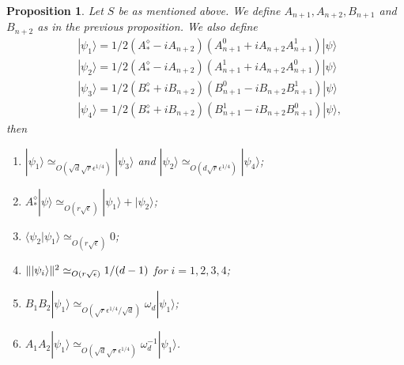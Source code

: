 \documentclass[11pt,letterpaper]{article}
\newcommand{\ket}[1]{|#1\rangle}
\newcommand{\braket}[2]{\langle#1|#2\rangle}
\DeclarePairedDelimiter{\norm}{\lVert}{\rVert}
\newcommand{\1}{\mathbb{1}}
\newcommand{\se}{\sqrt{\epsilon}}
\newcommand{\qe}{\epsilon^{1/4}}
\newcommand{\sd}{\sqrt{d}}
\newcommand{\sr}{\sqrt{r}}
\newcommand{\appd}[1]{\simeq_{#1}}
\newtheorem{proposition}[theorem]{Proposition}
\theoremstyle{definition}
\begin{document}
\begin{proposition}
	Let $S$ be as mentioned above. We define $A_{n+1}, A_{n+2},B_{n+1}$ and $B_{n+2}$ as in the previous proposition.
	We also define
	\begin{align}
		&\ket{\psi_1} =1/2 (A_\ast^\diamond - iA_{n+2})(A_{n+1}^0 + iA_{n+2}A_{n+1}^1) \ket{\psi} \\
		&\ket{\psi_2} = 1/2 (A_\ast^\diamond - iA_{n+2})(A_{n+1}^1 + iA_{n+2}A_{n+1}^0) \ket{\psi} \\
		&\ket{\psi_3} =1/2 (B_\ast^\diamond + i B_{n+2})(B_{n+1}^0 - iB_{n+2}B_{n+1}^1) \ket{\psi}  \\
		&\ket{\psi_4} =1/2 (B_\ast^\diamond + i B_{n+2})(B_{n+1}^1 - iB_{n+2}B_{n+1}^0) \ket{\psi},
	\end{align}
	then
	\begin{enumerate}
	\item $\ket{\psi_1} \appd{O(\sd \sr\qe)} \ket{\psi_3}$ and $\ket{\psi_2} \appd{O(d \sr\qe)} \ket{\psi_4}$; 
	\item $A_\ast^\diamond \ket{\psi} \appd{O( r\se)} \ket{\psi_1}+\ket{\psi_2}$;
	\item $\braket{\psi_2}{\psi_1} \appd{O( r\se)} 0$;
	\item $\norm{\ket{\psi_i}}^2 \appd{O(r\se)} 1/(d-1)$ for $i = 1, 2, 3, 4$;
	\item $B_1B_2 \ket{\psi_1} \appd{O(\sr \qe/\sd)} \omega_d\ket{\psi_1}$;
	\item $A_1A_2 \ket{\psi_1} \appd{O(\sd\sr \qe)} \omega_d^{-1} \ket{\psi_1}$.
	\end{enumerate}
\end{proposition}
\end{document}
